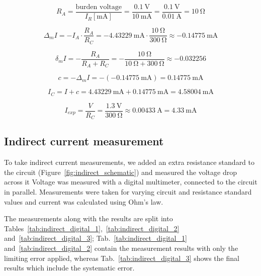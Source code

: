 \begin{equation}
	R_A = \frac{\text{burden voltage}}{I_R  [\unit{\milli\ampere}]} = \frac{\SI{0.1}{\volt}}{\SI{10}{\milli\ampere}}=\frac{\SI{0.1}{\volt}}{\SI{0.01}{\ampere}}=\SI{10}{\ohm}
\end{equation}

\begin{equation}
	\Delta_m I = -I_A \cdot\frac{R_A}{R_C} = -\SI{4.43229}{\milli\ampere}\cdot\frac{\SI{10}{\ohm}}{\SI{300}{\ohm}} \approx -\SI{0.14775}{\milli\ampere}
\end{equation}

\begin{equation}
	\delta_m I = -\frac{R_A}{R_A + R_C} = -\frac{\SI{10}{\ohm}}{\SI{10}{\ohm} + \SI{300}{\ohm}} \approx -0.032256
\end{equation}

\begin{equation}
	c = -\Delta_m I = -(-\SI{0.14775}{\milli\ampere}) =  \SI{0.14775}{\milli\ampere}
\end{equation}

\begin{equation}
	I_C = I + c =\SI{4.43229}{\milli\ampere} +\SI{0.14775}{\milli\ampere} = \SI{4.58004}{\milli\ampere}
\end{equation}

\begin{equation}
	I_{exp} = \frac{V}{R_C} = \frac{\SI{1.3}{\volt}}{\SI{300}{\ohm}} \approx \SI{0.00433}{\ampere} = \SI{4.33}{\milli\ampere}
\end{equation}


\subsection{Indirect current measurement}

To take indirect current measurements, we added an extra resistance standard to the circuit (Figure~\ref{fig:indirect_schematic}) and measured the voltage drop across it Voltage was measured with a digital multimeter, connected to the circuit in parallel. Measurements were taken for varying circuit and resistance standard values and current was calculated using Ohm's law.

The measurements along with the results are split into Tables~\ref{tab:indirect_digital_1},~\ref{tab:indirect_digital_2} and~\ref{tab:indirect_digital_3}; Tab.~\ref{tab:indirect_digital_1} and~\ref{tab:indirect_digital_2} contain the measurement results with only the limiting error applied, whereas Tab.~\ref{tab:indirect_digital_3} shows the final results which include the systematic error.

